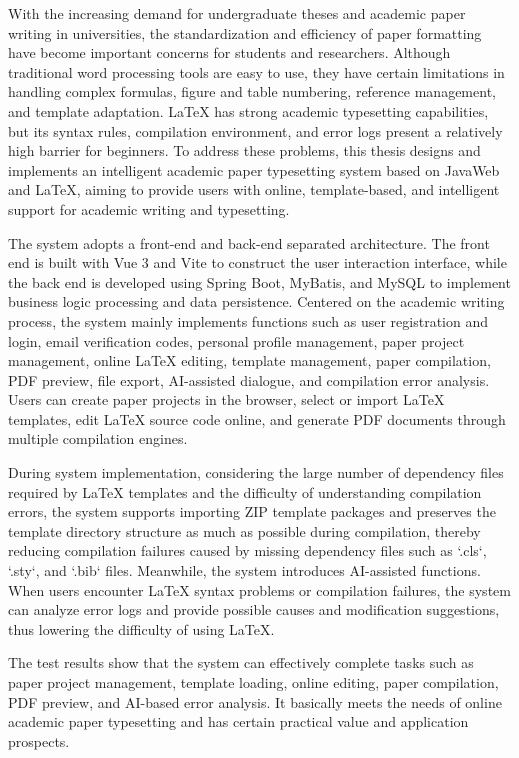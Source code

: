 With the increasing demand for undergraduate theses and academic paper writing in universities, the standardization and efficiency of paper formatting have become important concerns for students and researchers. Although traditional word processing tools are easy to use, they have certain limitations in handling complex formulas, figure and table numbering, reference management, and template adaptation. LaTeX has strong academic typesetting capabilities, but its syntax rules, compilation environment, and error logs present a relatively high barrier for beginners. To address these problems, this thesis designs and implements an intelligent academic paper typesetting system based on JavaWeb and LaTeX, aiming to provide users with online, template-based, and intelligent support for academic writing and typesetting.

The system adopts a front-end and back-end separated architecture. The front end is built with Vue 3 and Vite to construct the user interaction interface, while the back end is developed using Spring Boot, MyBatis, and MySQL to implement business logic processing and data persistence. Centered on the academic writing process, the system mainly implements functions such as user registration and login, email verification codes, personal profile management, paper project management, online LaTeX editing, template management, paper compilation, PDF preview, file export, AI-assisted dialogue, and compilation error analysis. Users can create paper projects in the browser, select or import LaTeX templates, edit LaTeX source code online, and generate PDF documents through multiple compilation engines.

During system implementation, considering the large number of dependency files required by LaTeX templates and the difficulty of understanding compilation errors, the system supports importing ZIP template packages and preserves the template directory structure as much as possible during compilation, thereby reducing compilation failures caused by missing dependency files such as `.cls`, `.sty`, and `.bib` files. Meanwhile, the system introduces AI-assisted functions. When users encounter LaTeX syntax problems or compilation failures, the system can analyze error logs and provide possible causes and modification suggestions, thus lowering the difficulty of using LaTeX.

The test results show that the system can effectively complete tasks such as paper project management, template loading, online editing, paper compilation, PDF preview, and AI-based error analysis. It basically meets the needs of online academic paper typesetting and has certain practical value and application prospects.
